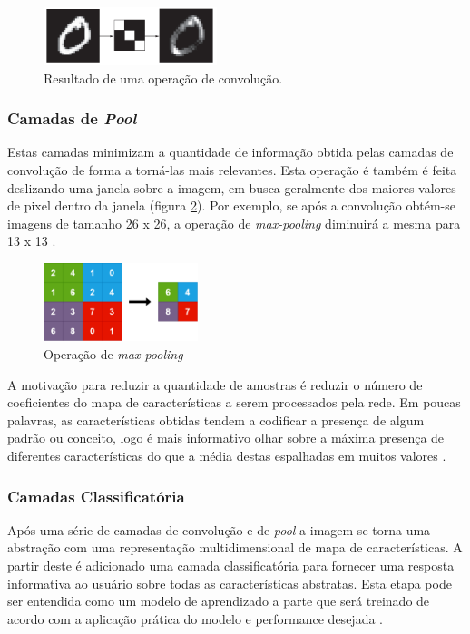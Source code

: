 \documentclass[12pt]{report}
\newcommand*{\captionsource}[2]{%
  \caption[{#1}]{%
    #1%
    \\\hspace{\linewidth}%
     \text{Fonte:}#2%
  }%
}
\begin{document}
\begin{figure}
    \centering
    \includegraphics[width=0.45\textwidth]{images/zero.png}
    \captionsource{Resultado de uma operação de convolução.}{ \protect\cite{chollet}}
    \label{fig:zero}
\end{figure}

\subsubsection{Camadas de \textit{Pool}}

Estas camadas minimizam a quantidade de informação obtida pelas camadas de convolução de forma a torná-las mais relevantes. Esta operação é também é feita deslizando uma janela sobre a imagem, em busca geralmente dos maiores valores de pixel dentro da janela (figura \ref{fig:maxpool}). Por exemplo, se após a convolução obtém-se imagens de tamanho 26 x 26, a operação de \textit{max-pooling} diminuirá a mesma para 13 x 13 \cite{chollet}.

\begin{figure}
    \centering
    \includegraphics[width=0.4\textwidth]{images/maxpool.png}
    \caption{Operação de \textit{max-pooling}}
    \label{fig:maxpool}
\end{figure}

A motivação para reduzir a quantidade de amostras é reduzir o número de coeficientes do mapa de características a serem processados pela rede. Em poucas palavras, as características obtidas tendem a codificar a presença de algum padrão ou conceito, logo é mais informativo olhar sobre a máxima presença de diferentes características do que a média destas espalhadas em muitos valores \cite{chollet}.

\subsubsection{Camadas Classificatória}

Após uma série de camadas de convolução e de \textit{pool} a imagem se torna uma abstração com uma representação multidimensional de mapa de características. A partir deste é adicionado uma camada classificatória para fornecer uma resposta informativa ao usuário sobre todas as características abstratas. Esta etapa pode ser entendida como um modelo de aprendizado a parte que será treinado de acordo com a aplicação prática do modelo e performance desejada \cite{chollet}.
\end{document}
